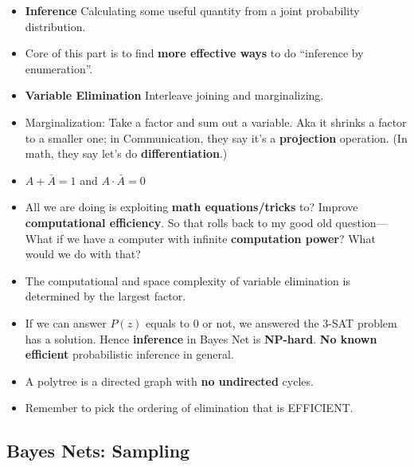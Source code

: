 \documentclass[twocolumn]{article}
\begin{document}
\begin{itemize}
\item \textbf{Inference} Calculating some useful quantity from a joint
  probability distribution.
\item Core of this part is to find \textbf{more effective ways} to do
  ``inference by enumeration''.
\item \textbf{Variable Elimination} Interleave joining and
  marginalizing. 
\item Marginalization: Take a factor and sum out a variable. Aka it
  shrinks a factor to a smaller one; in Communication, they say it's a
  \textbf{projection} operation. (In math, they say let's do
  \textbf{differentiation}.) 
\item $A+\bar{A}=1$ and $A\cdot\bar{A}=0$
\item All we are doing is exploiting \textbf{math equations/tricks}
  to? Improve \textbf{computational efficiency}. So that rolls back to
  my good old question---What if we have a computer with infinite
  \textbf{computation power}? What would we do with that?
\item The computational and space complexity of variable elimination
  is determined by the largest factor.
\item If we can answer $P(z)$ equals to $0$ or not, we answered the
  3-SAT problem has a solution. Hence \textbf{inference} in Bayes Net
  is \textbf{NP-hard}. \textbf{No known efficient} probabilistic
  inference in general.
\item A polytree is a directed graph with \textbf{no undirected}
  cycles. 
\item Remember to pick the ordering of elimination that is EFFICIENT.
\end{itemize}

\subsection{Bayes Nets: Sampling}
\label{sec:bayes-nets:-sampling}
\end{document}
